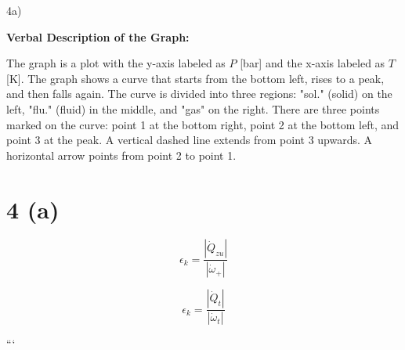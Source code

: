 4a) 

\textbf{Verbal Description of the Graph:}

The graph is a plot with the y-axis labeled as \( P \) [bar] and the x-axis labeled as \( T \) [K]. The graph shows a curve that starts from the bottom left, rises to a peak, and then falls again. The curve is divided into three regions: "sol." (solid) on the left, "flu." (fluid) in the middle, and "gas" on the right. There are three points marked on the curve: point 1 at the bottom right, point 2 at the bottom left, and point 3 at the peak. A vertical dashed line extends from point 3 upwards. A horizontal arrow points from point 2 to point 1.

\section*{4 (a)}

\[
\epsilon_k = \frac{\left| \dot{Q}_{zu} \right|}{\left| \dot{\omega}_+ \right|}
\]

\[
\epsilon_k = \frac{\left| \dot{Q}_t \right|}{\left| \dot{\omega}_t \right|}
\]

```